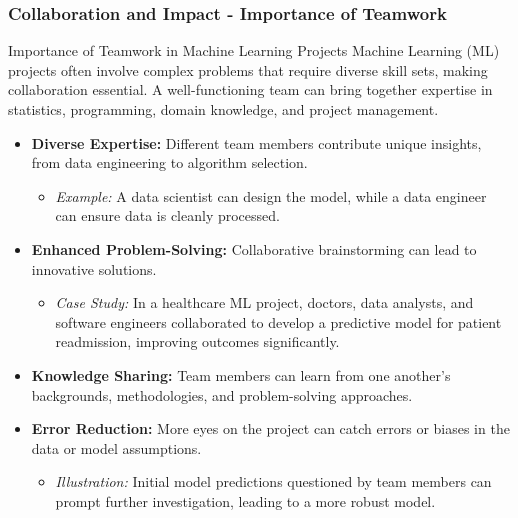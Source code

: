 \documentclass[aspectratio=169]{beamer}
\begin{document}
\begin{frame}[fragile]
    \frametitle{Collaboration and Impact - Importance of Teamwork}
    \begin{block}{Importance of Teamwork in Machine Learning Projects}
        Machine Learning (ML) projects often involve complex problems that require diverse skill sets, making collaboration essential. 
        A well-functioning team can bring together expertise in statistics, programming, domain knowledge, and project management.
    \end{block}
    
    \begin{itemize}
        \item \textbf{Diverse Expertise:} 
            Different team members contribute unique insights, from data engineering to algorithm selection.
            \begin{itemize}
                \item \textit{Example:} A data scientist can design the model, while a data engineer can ensure data is cleanly processed.
            \end{itemize}
        
        \item \textbf{Enhanced Problem-Solving:} 
            Collaborative brainstorming can lead to innovative solutions.
            \begin{itemize}
                \item \textit{Case Study:} In a healthcare ML project, doctors, data analysts, and software engineers collaborated to develop a predictive model for patient readmission, improving outcomes significantly.
            \end{itemize}
        
        \item \textbf{Knowledge Sharing:} 
            Team members can learn from one another’s backgrounds, methodologies, and problem-solving approaches.
        
        \item \textbf{Error Reduction:} 
            More eyes on the project can catch errors or biases in the data or model assumptions.
            \begin{itemize}
                \item \textit{Illustration:} Initial model predictions questioned by team members can prompt further investigation, leading to a more robust model.
            \end{itemize}
    \end{itemize}
\end{frame}
\end{document}
